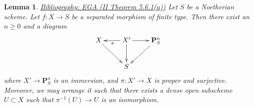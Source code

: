\documentclass{amsart}
\newenvironment{reference}{\comment}{\endcomment}
\theoremstyle{plain}
\newtheorem{lemma}[subsection]{Lemma}
\theoremstyle{definition}
\theoremstyle{remark}
\numberwithin{equation}{subsection}
\begin{document}
\begin{lemma}
\label{lemma-chow-Noetherian}
\begin{reference}
\href{https://stacks.math.columbia.edu/bibliography}{Bibliography: EGA (II Theorem 5.6.1(a))}
\end{reference}
Let $S$ be a Noetherian scheme.
Let $f : X \to S$ be a separated morphism of finite type.
Then there exist an $n \geq 0$ and a diagram
$$
\xymatrix{
X \ar[rd] & X' \ar[d] \ar[l]^\pi \ar[r] & \mathbf{P}^n_S \ar[dl] \\
& S &
}
$$
where $X' \to \mathbf{P}^n_S$ is an immersion, and
$\pi : X' \to X$ is proper and surjective. Moreover, we may
arrange it such that there exists a dense open subscheme
$U \subset X$ such that $\pi^{-1}(U) \to U$ is an isomorphism.
\end{lemma}
\end{document}
